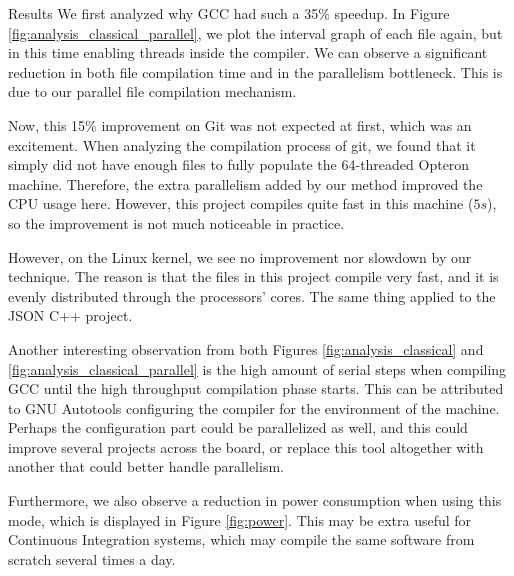 \begin{subsection}{Results}
We first analyzed why GCC had such a 35\% speedup. In Figure
\ref{fig:analysis_classical_parallel}, we plot the interval graph of each file
again, but in this time enabling threads inside the compiler. We can observe a
significant reduction in both file compilation time and in the parallelism bottleneck.
This is due to our parallel file compilation mechanism.

Now, this 15\% improvement on Git was not expected at first, which was an
excitement. When analyzing the compilation process of git, we found that it simply
did not have enough files to fully populate the 64-threaded Opteron machine.
Therefore, the extra parallelism added by our method improved the CPU usage
here.  However, this project compiles quite fast in this machine ($5s$), so the
improvement is not much noticeable in practice.

However, on the Linux kernel, we see no improvement nor slowdown by our
technique. The reason is that the files in this project compile very fast, and
it is evenly distributed through the processors' cores. The same thing applied
to the JSON C++ project.

Another interesting observation from both Figures \ref{fig:analysis_classical} and
\ref{fig:analysis_classical_parallel} is the high amount of serial steps when
compiling GCC until the high throughput compilation phase starts. This can be
attributed to GNU Autotools configuring the compiler for the environment of the
machine. Perhaps the configuration part could be parallelized as well, and this
could improve several projects across the board, or replace this tool
altogether with another that could better handle parallelism.

Furthermore, we also observe a reduction in power consumption when using this
mode, which is displayed in Figure \ref{fig:power}. This may be extra useful for Continuous Integration systems, which
may compile the same software from scratch several times a day.


\end{subsection}
